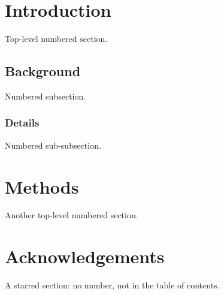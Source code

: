 \documentclass[12pt]{article}
\begin{document}
\tableofcontents

\section{Introduction}
Top-level numbered section.

\subsection{Background}
Numbered subsection.

\subsubsection{Details}
Numbered sub-subsection.

\section{Methods}
Another top-level numbered section.

\section*{Acknowledgements}
A starred section: no number, not in the table of contents.
\end{document}
